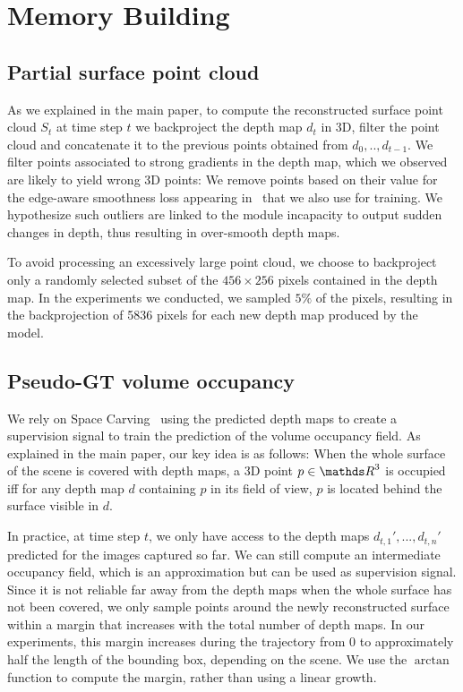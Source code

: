 \section{Memory Building}

\subsection{Partial surface point cloud}

As we explained in the main paper, to compute the reconstructed surface point cloud $S_t$ at time step $t$ we backproject the depth map $d_t$ in 3D, filter the point cloud and concatenate it to the previous points obtained from $d_0, .., d_{t-1}$.
We filter points associated to strong gradients in the depth map, which we observed are likely to yield wrong 3D points: We remove points based on their value for the edge-aware smoothness loss appearing in~\cite{watson-cvpr21-temporal-opportunist-manydepth,godard-cvpr17-unsupervisedmonoculardepth,heise-iccv13-pmhuber} that we also use for training.
%
We hypothesize such outliers are linked to the module incapacity to output sudden changes in depth, thus resulting in over-smooth depth maps.

To avoid processing an excessively large point cloud, we choose to backproject only a randomly selected subset of the $456 \times 256$ pixels contained in the depth map. In the experiments we conducted, we sampled $5\%$ of the pixels, resulting in the backprojection of 5836 pixels for each new depth map produced by the model.

\subsection{Pseudo-GT volume occupancy}

We rely on Space Carving~\cite{kutulakos00space} using the predicted depth maps to create a supervision signal to train the prediction of the volume occupancy field. As explained in the main paper, our key idea is as follows: When the whole surface of the scene is covered with depth maps, a 3D point $p \in \IR^3$ is occupied iff for any depth map $d$ containing $p$ in its field of view, $p$ is located behind the surface visible in $d$.

In practice, at time step $t$, we only have access to the depth maps $d_{t, 1}', ..., d_{t,n}'$ predicted for the images captured so far. We can still compute an intermediate occupancy field, which is an approximation but can be used as supervision signal. Since it is not reliable far away from the depth maps when the whole surface has not been covered, we only sample points around the newly reconstructed surface within a margin that increases with the total number of depth maps. In our experiments, this margin increases during the trajectory from 0 to approximately half the length of the bounding box, depending on the scene. We use the $\arctan$ function to compute the margin, rather than using a linear growth.

